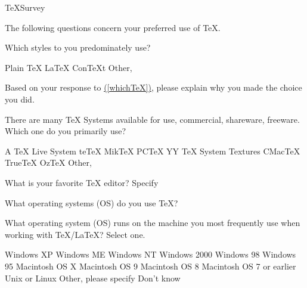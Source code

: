 \documentclass{article}
\begin{document}
\begin{exam}{TeXSurvey}
\begin{problem*}
The following questions concern your preferred use of \TeX.
\begin{parts}
\item\label{whichTeX} Which styles to you predominately use?
\begin{answers}{4}
\rowsep{1bp}
\bChoices[2]
     Plain \TeX\eAns
     \LaTeX\eAns
     Con\TeX t\eAns
     Other, \eAns
\eChoices
\end{answers}

\item Based on your response to \hyperref[whichTeX]{(\ref*{whichTeX})},
please explain why you made the choice you did.
\begin{solution}[.75in]
\end{solution}


\item There are many {\TeX} Systems available for use, commercial,
shareware, freeware. Which one do you primarily use?
\begin{answers}{4}
\rowsep{1bp}
\bChoices
     A \TeX{} Live System\eAns
     te\TeX\eAns
     Mik\TeX\eAns
     PC\TeX\eAns
     Y\negthinspace{\scriptsize\&}\negthinspace Y \TeX{} System\eAns
     Textures\eAns
     CMac\TeX\eAns
     True\TeX\eAns
     Oz\TeX\eAns
     Other, \eAns
\eChoices
\end{answers}

\item What is your favorite {\TeX} editor? Specify \fillin{1.75in}{\empty}

\end{parts}
\end{problem*}

\begin{problem*}
What operating systems (OS) do you use \TeX?

\setlength\columnseprule{0pt}

\begin{parts}

\item What operating system (OS) runs on the machine you
most frequently use when working with \TeX/\LaTeX? Select one.
\begin{multicols}{2}
\begin{answers}{1}
\bChoices
      Windows XP\eAns
      Windows ME\eAns
      Windows NT\eAns
      Windows 2000\eAns
      Windows 98\eAns
      Windows 95\eAns
      Macintosh OS X\eAns
      Macintosh OS 9\eAns
      Macintosh OS 8\eAns
      Macintosh OS 7 or earlier\eAns
      Unix or Linux\eAns
      Other, please specify \fillin{1.25in}{\empty}\eAns
      Don't know\eAns
\eChoices
\end{answers}
\end{multicols}


\end{parts}
\end{problem*}
\end{exam}
\end{document}
